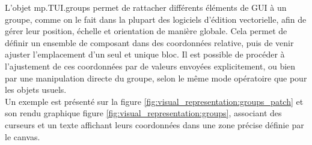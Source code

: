 \noindent L'objet mp.TUI.groups permet de rattacher différents éléments de GUI à un groupe, comme on le fait dans la plupart des logiciels d'édition vectorielle, afin de gérer leur position, échelle et orientation de manière globale. Cela permet de définir un ensemble de composant dans des coordonnées relative, puis de venir ajuster l'emplacement d'un seul et unique bloc. Il est possible de procéder à l'ajustement de ces coordonnées par de valeurs envoyées explicitement, ou bien par une manipulation directe du groupe, selon le même mode opératoire que pour les objets usuels.\\
\indent Un exemple est présenté sur la figure \ref{fig:visual_representation:groups_patch} et son rendu graphique figure \ref{fig:visual_representation:groups}, associant des curseurs et un texte affichant leurs coordonnées dans une zone précise définie par le canvas.


